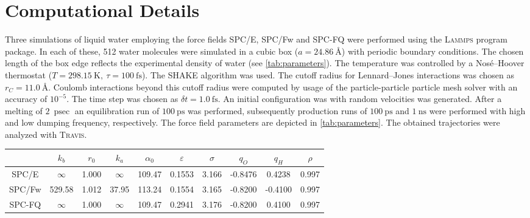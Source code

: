 \documentclass[a4paper,12pt]{scrartcl}
\begin{document}
\section{Computational Details}
%
	Three simulations of liquid water employing the force fields SPC/E, SPC/Fw and SPC-FQ were performed using the \textsc{Lammps}\autocite{plimpton1995fast} program package. In each of these, 512 water molecules were simulated in a cubic box ($ a = \SI{24.86}{\angstrom} $) with periodic boundary conditions. The chosen length of the box edge reflects the experimental density of water (see \autoref{tab:parameters}). The temperature was controlled by a Nos\'{e}--Hoover thermostat\autocite{nose1984unified,nose1984molecular}  ($T = \SI{298.15}{\kelvin},~ \tau=\SI{100}{\femto\second}$). The SHAKE\autocite{ryckaert1977numerical} algorithm was used. The cutoff radius for Lennard--Jones interactions was chosen as \linebreak $ r_C = \SI{11.0}{\angstrom} $. Coulomb interactions beyond this cutoff radius were computed by usage of the particle-particle particle mesh solver\autocite{hockney1988computer} with an accuracy of $10^{-5}$. The time step was chosen as $ \delta t=\SI{1.0}{\femto\second} $. An initial configuration was with random velocities was generated. After a melting of $ \SI{2}{\pico\sec} $ an equilibration run of $ \SI{100}{\pico\second} $ was performed, subsequently production runs of  $ \SI{100}{\pico\second} $ and $ \SI{1}{\nano\second} $ were performed with high and low dumping frequency, respectively. The force field parameters are depicted in \autoref{tab:parameters}. The obtained trajectories were analyzed with \textsc{Travis}\autocite{brehm2011travis,brehm2020travis}.
	\begin{table}
		\centering
		\label{tab:parameters}
		\begin{tabular}{c|ccccccccc}
			\toprule
			& $ k_b $ & $ r_0 $ & $ k_a $ & $ \alpha_0 $ & $ \varepsilon $ & $ \sigma $ & $ q_O $ & $q_H $ & $ \rho $ \\ 
			\midrule
			SPC/E & $ \infty $ & 1.000 & $ \infty $ & 109.47 & 0.1553 & 3.166 & -0.8476 & 0.4238 & 0.997\\
			SPC/Fw & 529.58 & 1.012 & 37.95 & 113.24 & 0.1554 & 3.165 & -0.8200 & -0.4100 & 0.997 \\
			SPC-FQ & $\infty $ & 1.000 & $ \infty $ & 109.47 & 0.2941 & 3.176 & -0.8200 & 0.4100 & 0.997\\
			\bottomrule
		\end{tabular}
	\end{table}
%
\end{document}
